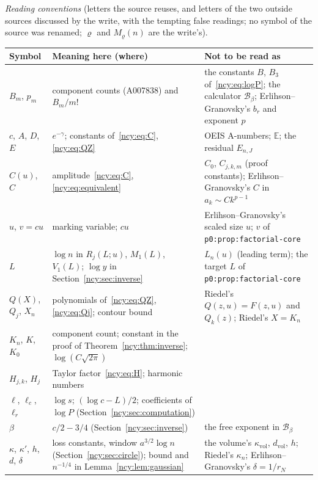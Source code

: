 \documentclass[11pt,letterpaper]{article}
\numberwithin{equation}{section}
\theoremstyle{remark}\newtheorem{remark}[theorem]{Remark}
\newcommand{\EE}{\mathbb E}
\newcommand{\file}[1]{\nolinkurl{#1}}
\theoremstyle{definition}\newtheorem{definition}[theorem]{Definition}\theoremstyle{plain}
\begin{document}
\medskip\noindent\begin{minipage}{\textwidth}
\emph{Reading conventions} (letters the source reuses, and letters of the
two outside sources discussed by the write, with the tempting false
readings; no symbol of the source was renamed; $\varrho$ and $M_\varrho(n)$
are the write's).\par
\smallskip
\begingroup\small\renewcommand{\arraystretch}{1.1}
\noindent\begin{tabular}{@{}>{\raggedright\arraybackslash}p{1.0in}>{\raggedright\arraybackslash}p{2.9in}>{\raggedright\arraybackslash}p{2.2in}@{}}
\toprule
Symbol & Meaning here (where) & Not to be read as\\
\midrule
$B_m$, $p_m$ & component counts (A007838) and $B_m/m!$ & the constants $B$, $B_3$ of~\eqref{ncy:eq:logP}; the calculator $\mathcal B_\beta$; Erlihson--Granovsky's $b_r$ and exponent $p$\\
$c$, $A$, $D$, $E$ & $e^{-\gamma}$; constants of~\eqref{ncy:eq:C}, \eqref{ncy:eq:QZ} & OEIS A-numbers; $\EE$; the residual $E_{n,J}$\\
$C(u)$, $C$ & amplitude~\eqref{ncy:eq:C}, \eqref{ncy:eq:equivalent} & $C_0$, $C_{j,k,m}$ (proof constants); Erlihson--Granovsky's $C$ in $a_k\sim Ck^{p-1}$\\
$u$, $v=cu$ & marking variable; $cu$ & Erlihson--Granovsky's scaled size $u$; $v$ of \file{p0:prop:factorial-core}\\
$L$ & $\log n$ in $R_j(L;u)$, $M_1(L)$, $V_1(L)$; $\log y$ in Section~\ref{ncy:sec:inverse} & $L_n(u)$ (leading term); the target $L$ of \file{p0:prop:factorial-core}\\
$Q(X)$, $Q_j$, $X_n$ & polynomials of~\eqref{ncy:eq:QZ}, \eqref{ncy:eq:Qj}; contour bound & Riedel's $Q(z,u)=F(z,u)$ and $Q_k(z)$; Riedel's $X=K_n$\\
$K_n$, $K$, $K_0$ & component count; constant in the proof of Theorem~\ref{ncy:thm:inverse}; $\log(C\sqrt{2\pi})$ & \\
$H_{j,k}$, $H_j$ & Taylor factor~\eqref{ncy:eq:H}; harmonic numbers & \\
$\ell$, $\ell_c$, $\ell_r$ & $\log s$; $(\log c-L)/2$; coefficients of $\log P$ (Section~\ref{ncy:sec:computation}) & \\
$\beta$ & $c/2-3/4$ (Section~\ref{ncy:sec:inverse}) & the free exponent in $\mathcal B_\beta$\\
$\kappa$, $\kappa'$, $h$, $d$, $\delta$ & loss constants, window $a^{3/2}\log n$ (Section~\ref{ncy:sec:circle}); bound and $n^{-1/4}$ in Lemma~\ref{ncy:lem:gaussian} & the volume's $\kappa_{\mathrm{vol}}$, $d_{\mathrm{vol}}$, $h$; Riedel's $\kappa_n$; Erlihson--Granovsky's $\delta=1/r_N$\\

\end{tabular}
\end{minipage}
\end{document}
